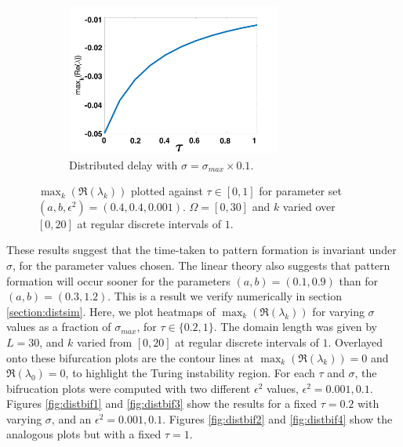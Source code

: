 \begin{figure}[H]
\begin{subfigure}[b]{0.45\textwidth}
        \includegraphics[width=7cm,height=5cm]{p3sigmax10.png}
        \caption{Distributed delay with $\sigma=\sigma_{max}\times0.1$.}
        \label{}
    \end{subfigure}
    \caption{$\max_k(\Re(\lambda_k))$ plotted against $\tau\in[0,1]$ for parameter set $(a,b,\epsilon^2)=(0.4,0.4,0.001)$. $\Omega=[0,30]$ and $k$ varied over $[0,20]$ at regular discrete intervals of $1$.}
    \label{fig:p3}
\end{figure}

These results suggest that the time-taken to pattern formation is invariant under $\sigma$, for the parameter values chosen. The linear theory also suggests that pattern formation will occur sooner for the parameters $(a,b)=(0.1,0.9)$ than for $(a,b)=(0.3,1.2)$. This is a result we verify numerically in section \ref{section:distsim}. Here,  we plot heatmaps of $\max_k(\Re(\lambda_k))$ for varying $\sigma$ values as a fraction of $\sigma_{max}$, for $\tau\in\{0.2,1\}$. The domain length was given by $L=30$, and $k$ varied from $[0,20]$ at regular discrete intervals of $1$. Overlayed onto these bifurcation plots are the contour lines at $\max_k(\Re(\lambda_k))=0$ and $\Re(\lambda_0)=0$, to highlight the Turing instability region. For each $\tau$ and $\sigma$, the bifrucation plots were computed with two different $\epsilon^2$ values, $\epsilon^2=0.001,0.1$. Figures \ref{fig:distbif1} and \ref{fig:distbif3} show the results for a fixed $\tau=0.2$ with varying $\sigma$, and an $\epsilon^2=0.001,0.1$. Figures \ref{fig:distbif2} and \ref{fig:distbif4} show the analogous plots but with a fixed $\tau=1$.

